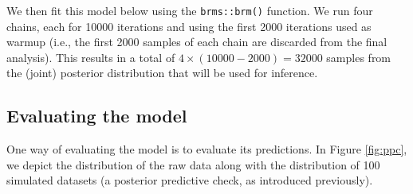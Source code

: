 \documentclass[
  11pt,
  english,
  ,doc,mask,floatsintext]{apa6}
\newenvironment{Shaded}{}{}
\newcommand{\AttributeTok}[1]{\textcolor[rgb]{0.49,0.56,0.16}{#1}}
\newcommand{\CommentTok}[1]{\textcolor[rgb]{0.38,0.63,0.69}{\textit{#1}}}
\newcommand{\ConstantTok}[1]{\textcolor[rgb]{0.53,0.00,0.00}{#1}}
\newcommand{\DecValTok}[1]{\textcolor[rgb]{0.25,0.63,0.44}{#1}}
\newcommand{\FloatTok}[1]{\textcolor[rgb]{0.25,0.63,0.44}{#1}}
\newcommand{\FunctionTok}[1]{\textcolor[rgb]{0.02,0.16,0.49}{#1}}
\newcommand{\NormalTok}[1]{#1}
\newcommand{\OtherTok}[1]{\textcolor[rgb]{0.00,0.44,0.13}{#1}}
\newcommand{\SpecialCharTok}[1]{\textcolor[rgb]{0.25,0.44,0.63}{#1}}
\newcommand{\StringTok}[1]{\textcolor[rgb]{0.25,0.44,0.63}{#1}}
\begin{document}
\begin{Shaded}
\end{Shaded}

We then fit this model below using the \texttt{brms::brm()} function. We run four chains, each for 10000 iterations and using the first 2000 iterations used as warmup (i.e., the first 2000 samples of each chain are discarded from the final analysis). This results in a total of \(4 \times (10000 - 2000) = 32000\) samples from the (joint) posterior distribution that will be used for inference.

\hypertarget{evaluating-the-model}{%
\subsection{Evaluating the model}\label{evaluating-the-model}}

One way of evaluating the model is to evaluate its predictions. In Figure \ref{fig:ppc}, we depict the distribution of the raw data along with the distribution of 100 simulated datasets (a posterior predictive check, as introduced previously).
\end{document}
